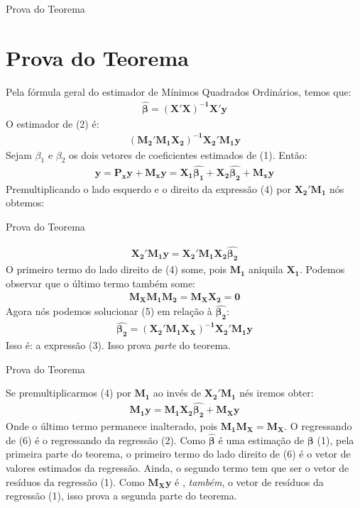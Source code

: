 \documentclass[11pt]{beamer}
\begin{document}
\begin{frame}{Prova do Teorema}
\section{Prova do Teorema}
Pela fórmula geral do estimador de Mínimos Quadrados Ordinários, temos que:
\begin{align*}
	\mathbf{\hat{\beta} = (X'X)^{-1}X'y}
\end{align*}
O estimador de (2) é:
\begin{align}
	\mathbf{(M_{2}'M_{1}X_{2})^{-1}X_{2}'M_{1}y}
\end{align}
Sejam $\beta_1$ e $\beta_2$ os dois vetores de coeficientes estimados de (1). Então:
\begin{align}
	\mathbf{y = P_{x}y + M_{x}y = X_{1}\hat{\beta_1} + X_{2}\hat{\beta_2} + M_{x}y}
\end{align}
Premultiplicando o lado esquerdo e o direito da expressão (4) por $\mathbf{X_{2}'M_{1}}$ nós obtemos:
\end{frame}

\begin{frame}{Prova do Teorema}

\begin{align}
	\mathbf{X_{2}'M_{1}y = X_{2}'M_{1}X_{2}\hat{\beta_{2}}}
\end{align}   
O primeiro termo do lado direito de (4) some, pois $\mathbf{M_{1}}$ aniquila $\mathbf{X_1}$. Podemos observar que o último termo também some:
\begin{align*}
	\mathbf{M_{X}M_{1}M_{2} = M_{X}X_{2} = 0}
\end{align*}
Agora nós podemos solucionar (5) em relação à $\mathbf{\hat{\beta_2}}$:
\begin{align*}
	\mathbf{\hat{\beta_2} = (X_{2}'M_{1}X_{X})^{-1}X_{2}'M_{1}y}
\end{align*}
Isso é: a expressão (3). Isso prova \textit{parte} do teorema.
   
\end{frame}

\begin{frame}{Prova do Teorema}

Se premultiplicarmos (4) por $\mathbf{M_1}$ ao invés de $\mathbf{X_{2}'M_1}$ nés iremos obter:
\begin{align}
	\mathbf{M_{1}y = M_{1}X_{2}\hat{\beta_{2}}  + M_{X}y}
\end{align}
Onde o último termo permanece inalterado, pois $\mathbf{M_{1}M_{X}=M_{X}}$. O regressando de (6) é o regressando da regressão (2). Como $\mathbf{\hat{\beta}}$ é uma estimação de $\mathbf{\beta}$ (1), pela primeira parte do teorema, o primeiro termo do lado direito de (6) é o vetor de valores estimados da regressão. Ainda, o segundo termo tem que ser o vetor de resíduos da regressão (1). Como $\mathbf{M_{X}y}$ é , \textit{também}, o vetor de resíduos da regressão (1), isso prova a segunda parte do teorema. 

\end{frame}
\end{document}

